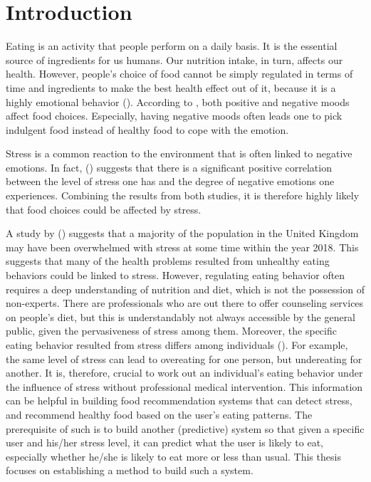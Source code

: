 
\chapter{Introduction}\label{chapter:introduction}
Eating is an activity that people perform on a daily basis. It is the essential source of ingredients for us humans. Our nutrition intake, in turn, affects our health. However, people’s choice of food cannot be simply regulated in terms of time and ingredients to make the best health effect out of it, because it is a highly emotional behavior (\cite{4_mood_eat}). According to \citeauthor{4_mood_eat}, both positive and negative moods affect food choices. Especially, having negative moods often leads one to pick indulgent food instead of healthy food to cope with the emotion.

Stress is a common reaction to the environment that is often linked to negative emotions. In fact, \citeauthor{1_stress_emotion} (\citeyear{1_stress_emotion}) suggests that there is a significant positive correlation between the level of stress one has and the degree of negative emotions one experiences. Combining the results from both studies, it is therefore highly likely that food choices could be affected by stress.

A study by \citeauthor{2_many_stress} (\citeyear{2_many_stress}) suggests that a majority of the population in the United Kingdom may have been overwhelmed with stress at some time within the year 2018. This suggests that many of the health problems resulted from unhealthy eating behaviors could be linked to stress. However, regulating eating behavior often requires a deep understanding of nutrition and diet, which is not the possession of non-experts. There are professionals who are out there to offer counseling services on people’s diet, but this is understandably not always accessible by the general public, given the pervasiveness of stress among them. Moreover, the specific eating behavior resulted from stress differs among individuals (\cite{5_stress_eating}). For example, the same level of stress can lead to overeating for one person, but undereating for another. It is, therefore, crucial to work out an individual’s eating behavior under the influence of stress without professional medical intervention. This information can be helpful in building food recommendation systems that can detect stress, and recommend healthy food based on the user’s eating patterns. The prerequisite of such is to build another (predictive) system so that given a specific user and his/her stress level, it can predict what the user is likely to eat, especially whether he/she is likely to eat more or less than usual. This thesis focuses on establishing a method to build such a system. \bigskip

